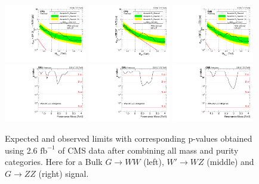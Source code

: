 \begin{figure}[h!]
\centering
\includegraphics[width=0.32\textwidth]{figures/analysis/search1/AN-15-211/limits/brazilianFlag_BulkWW_new_combined_13TeV.pdf}
\includegraphics[width=0.32\textwidth]{figures/analysis/search1/AN-15-211/limits/brazilianFlag_WZ_new_combined_13TeV.pdf}
\includegraphics[width=0.32\textwidth]{figures/analysis/search1/AN-15-211/limits/brazilianFlag_BulkZZ_new_combined_13TeV.pdf}\\
\includegraphics[width=0.32\textwidth]{figures/analysis/search1/AN-15-211/pvalues/pvalue_BulkWWin_combined_new.pdf}
\includegraphics[width=0.32\textwidth]{figures/analysis/search1/AN-15-211/pvalues/pvalue_WZin_combined_new.pdf}
\includegraphics[width=0.32\textwidth]{figures/analysis/search1/AN-15-211/pvalues/pvalue_BulkZZin_combined_new.pdf}\\
\caption{Expected and observed limits with corresponding p-values obtained using 2.6 $\textrm{fb}^{-1}$ of CMS data after combining all mass and purity categories. Here for a Bulk $G\rightarrow WW$ (left), $W'\rightarrow WZ$ (middle) and $G\rightarrow ZZ$ (right) signal.}
\label{fig:searchI:Limits_CombNew}
\end{figure}



